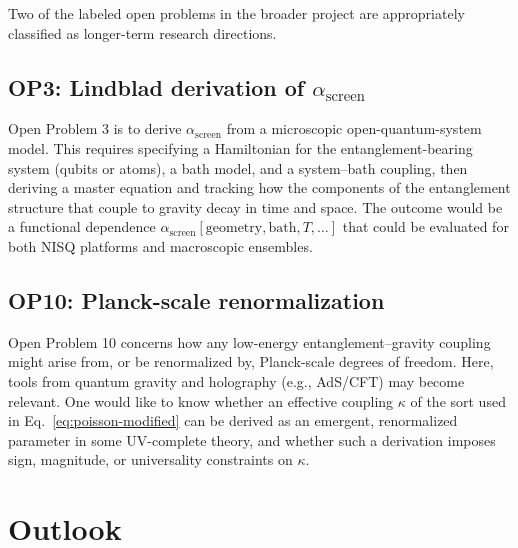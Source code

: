\documentclass[11pt]{article}
\begin{document}
Two of the labeled open problems in the broader project are appropriately classified as longer-term research directions.

\subsection{OP3: Lindblad derivation of $\alpha_{\text{screen}}$}

Open Problem 3 is to derive $\alpha_{\text{screen}}$ from a microscopic open-quantum-system model. This requires specifying a Hamiltonian for the entanglement-bearing system (qubits or atoms), a bath model, and a system--bath coupling, then deriving a master equation and tracking how the components of the entanglement structure that couple to gravity decay in time and space. The outcome would be a functional dependence $\alpha_{\text{screen}}[\text{geometry},\text{bath},T,\ldots]$ that could be evaluated for both NISQ platforms and macroscopic ensembles.

\subsection{OP10: Planck-scale renormalization}

Open Problem 10 concerns how any low-energy entanglement--gravity coupling might arise from, or be renormalized by, Planck-scale degrees of freedom. Here, tools from quantum gravity and holography (e.g., AdS/CFT) may become relevant. One would like to know whether an effective coupling $\kappa$ of the sort used in Eq.~\eqref{eq:poisson-modified} can be derived as an emergent, renormalized parameter in some UV-complete theory, and whether such a derivation imposes sign, magnitude, or universality constraints on $\kappa$.

\section{Outlook}
\end{document}
